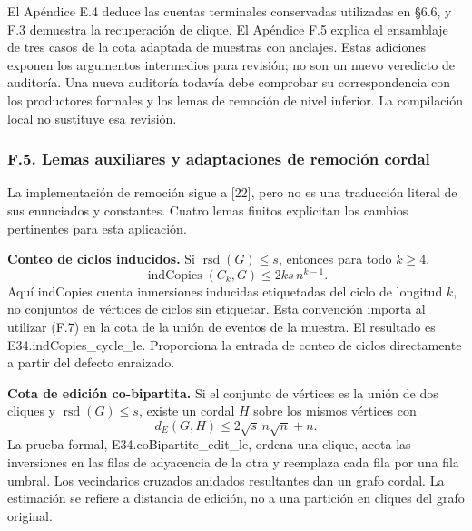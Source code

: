 \documentclass[spanish,11pt,a4paper]{article}
\begin{document}
El Apéndice E.4 deduce las cuentas terminales conservadas utilizadas en §6.6, y F.3 demuestra la recuperación de clique. El Apéndice F.5 explica el ensamblaje de tres casos de la cota adaptada de muestras con anclajes. Estas adiciones exponen los argumentos intermedios para revisión; no son un nuevo veredicto de auditoría. Una nueva auditoría todavía debe comprobar su correspondencia con los productores formales y los lemas de remoción de nivel inferior. La compilación local no sustituye esa revisión.

\subsubsection{F.5. Lemas auxiliares y adaptaciones de remoción cordal}\label{f.5.-lemas-auxiliares-y-adaptaciones-de-remocion-cordal}

La implementación de remoción sigue a {[}22{]}, pero no es una traducción literal de sus enunciados y constantes. Cuatro lemas finitos explicitan los cambios pertinentes para esta aplicación.

\textbf{Conteo de ciclos inducidos.} Si \(\operatorname{rsd}(G)\le s\), entonces para todo \(k\ge4\), \[
\operatorname{indCopies}(C_k,G)\le2ks\,n^{k-1}.
\tag{F.7}
\] Aquí indCopies cuenta inmersiones inducidas etiquetadas del ciclo de longitud \(k\), no conjuntos de vértices de ciclos sin etiquetar. Esta convención importa al utilizar (F.7) en la cota de la unión de eventos de la muestra. El resultado es {\ttfamily\small E34.\discretionary{\hbox{\ensuremath{\hookrightarrow}}}{}{}indCopies\_\discretionary{\hbox{\ensuremath{\hookrightarrow}}}{}{}cycle\_\discretionary{\hbox{\ensuremath{\hookrightarrow}}}{}{}le}. Proporciona la entrada de conteo de ciclos directamente a partir del defecto enraizado.

\textbf{Cota de edición co-bipartita.} Si el conjunto de vértices es la unión de dos cliques y \(\operatorname{rsd}(G)\le s\), existe un cordal \(H\) sobre los mismos vértices con \[
d_E(G,H)\le2\sqrt{s}\,n\sqrt n+n.
\tag{F.8}
\] La prueba formal, {\ttfamily\small E34.\discretionary{\hbox{\ensuremath{\hookrightarrow}}}{}{}coBipartite\_\discretionary{\hbox{\ensuremath{\hookrightarrow}}}{}{}edit\_\discretionary{\hbox{\ensuremath{\hookrightarrow}}}{}{}le}, ordena una clique, acota las inversiones en las filas de adyacencia de la otra y reemplaza cada fila por una fila umbral. Los vecindarios cruzados anidados resultantes dan un grafo cordal. La estimación se refiere a distancia de edición, no a una partición en cliques del grafo original.
\end{document}
